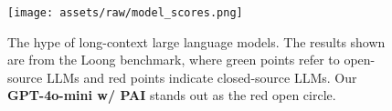 \begin{figure}
    \centering
    \texttt{[image: assets/raw/model\_scores.png]}\vspace{-2mm}
    \caption{The hype of long-context large language models. The results shown are from the Loong benchmark, where green points refer to open-source LLMs and red points indicate closed-source LLMs. Our \textbf{GPT-4o-mini w/ PAI} stands out as the red open circle. }
    \label{fig:length_score}
    \vspace{-4mm}
\end{figure}